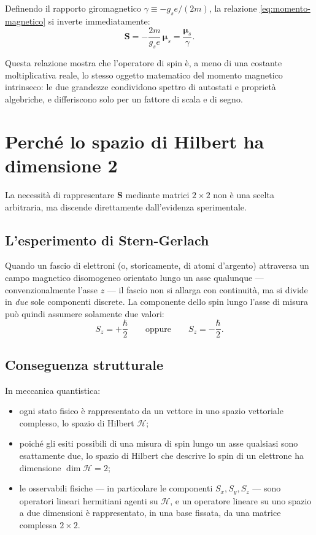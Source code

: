 \documentclass[11pt,a4paper]{article}
\begin{document}
Definendo il rapporto giromagnetico $\gamma \equiv -g_s e/(2m)$, la relazione \eqref{eq:momento-magnetico} si inverte immediatamente:
\begin{equation}
\mathbf{S} = -\frac{2m}{g_s e}\,\boldsymbol{\mu}_s = \frac{\boldsymbol{\mu}_s}{\gamma}.
\label{eq:S-da-mu}
\end{equation}

Questa relazione mostra che l'operatore di spin è, a meno di una costante moltiplicativa reale, lo stesso oggetto matematico del momento magnetico intrinseco: le due grandezze condividono spettro di autostati e proprietà algebriche, e differiscono solo per un fattore di scala e di segno.

\section{Perché lo spazio di Hilbert ha dimensione 2}

La necessità di rappresentare $\mathbf{S}$ mediante matrici $2\times 2$ non è una scelta arbitraria, ma discende direttamente dall'evidenza sperimentale.

\subsection{L'esperimento di Stern-Gerlach}

Quando un fascio di elettroni (o, storicamente, di atomi d'argento) attraversa un campo magnetico disomogeneo orientato lungo un asse qualunque — convenzionalmente l'asse $z$ — il fascio non si allarga con continuità, ma si divide in \emph{due} sole componenti discrete. La componente dello spin lungo l'asse di misura può quindi assumere solamente due valori:
\[
S_z = +\frac{\hbar}{2} \qquad \text{oppure} \qquad S_z = -\frac{\hbar}{2}.
\]

\subsection{Conseguenza strutturale}

In meccanica quantistica:
\begin{itemize}[nosep]
  \item ogni stato fisico è rappresentato da un vettore in uno spazio vettoriale complesso, lo spazio di Hilbert $\mathcal{H}$;
  \item poiché gli esiti possibili di una misura di spin lungo un asse qualsiasi sono esattamente due, lo spazio di Hilbert che descrive lo spin di un elettrone ha dimensione $\dim\mathcal{H}=2$;
  \item le osservabili fisiche — in particolare le componenti $S_x, S_y, S_z$ — sono operatori lineari hermitiani agenti su $\mathcal{H}$, e un operatore lineare su uno spazio a due dimensioni è rappresentato, in una base fissata, da una matrice complessa $2\times 2$.
\end{itemize}
\end{document}
